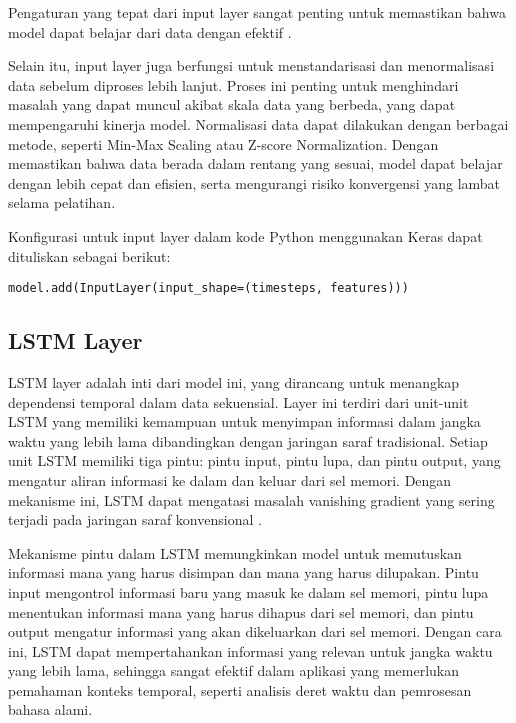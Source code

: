 Pengaturan yang tepat dari input layer sangat penting untuk memastikan bahwa model dapat belajar dari data dengan efektif \cite{hochreiter1997}.

\par Selain itu, input layer juga berfungsi untuk menstandarisasi dan menormalisasi data sebelum diproses lebih lanjut. Proses ini penting untuk menghindari masalah yang dapat muncul akibat skala data yang berbeda, yang dapat mempengaruhi kinerja model. Normalisasi data dapat dilakukan dengan berbagai metode, seperti Min-Max Scaling atau Z-score Normalization. Dengan memastikan bahwa data berada dalam rentang yang sesuai, model dapat belajar dengan lebih cepat dan efisien, serta mengurangi risiko konvergensi yang lambat selama pelatihan.

\par Konfigurasi untuk input layer dalam kode Python menggunakan Keras dapat dituliskan sebagai berikut:
    
\lstinline[]|model.add(InputLayer(input_shape=(timesteps, features)))|
  

\subsection{LSTM Layer}
\par LSTM layer adalah inti dari model ini, yang dirancang untuk menangkap dependensi temporal dalam data sekuensial. Layer ini terdiri dari unit-unit LSTM yang memiliki kemampuan untuk menyimpan informasi dalam jangka waktu yang lebih lama dibandingkan dengan jaringan saraf tradisional. Setiap unit LSTM memiliki tiga pintu: pintu input, pintu lupa, dan pintu output, yang mengatur aliran informasi ke dalam dan keluar dari sel memori. Dengan mekanisme ini, LSTM dapat mengatasi masalah vanishing gradient yang sering terjadi pada jaringan saraf konvensional \cite{graves2013}.

\par Mekanisme pintu dalam LSTM memungkinkan model untuk memutuskan informasi mana yang harus disimpan dan mana yang harus dilupakan. Pintu input mengontrol informasi baru yang masuk ke dalam sel memori, pintu lupa menentukan informasi mana yang harus dihapus dari sel memori, dan pintu output mengatur informasi yang akan dikeluarkan dari sel memori. Dengan cara ini, LSTM dapat mempertahankan informasi yang relevan untuk jangka waktu yang lebih lama, sehingga sangat efektif dalam aplikasi yang memerlukan pemahaman konteks temporal, seperti analisis deret waktu dan pemrosesan bahasa alami.

